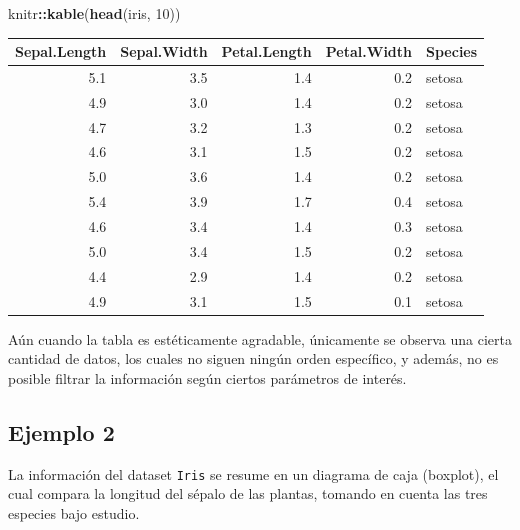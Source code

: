 \documentclass[
]{book}
\newenvironment{Shaded}{\begin{snugshade}}{\end{snugshade}}
\newcommand{\DataTypeTok}[1]{\textcolor[rgb]{0.13,0.29,0.53}{#1}}
\newcommand{\DecValTok}[1]{\textcolor[rgb]{0.00,0.00,0.81}{#1}}
\newcommand{\KeywordTok}[1]{\textcolor[rgb]{0.13,0.29,0.53}{\textbf{#1}}}
\newcommand{\NormalTok}[1]{#1}
\newcommand{\OperatorTok}[1]{\textcolor[rgb]{0.81,0.36,0.00}{\textbf{#1}}}
\newcommand{\StringTok}[1]{\textcolor[rgb]{0.31,0.60,0.02}{#1}}
\begin{document}
\begin{Shaded}
\begin{Highlighting}[]
\NormalTok{knitr}\OperatorTok{::}\KeywordTok{kable}\NormalTok{(}\KeywordTok{head}\NormalTok{(iris, }\DecValTok{10}\NormalTok{))}
\end{Highlighting}
\end{Shaded}

\begin{tabular}{r|r|r|r|l}
\hline
Sepal.Length & Sepal.Width & Petal.Length & Petal.Width & Species\\
\hline
5.1 & 3.5 & 1.4 & 0.2 & setosa\\
\hline
4.9 & 3.0 & 1.4 & 0.2 & setosa\\
\hline
4.7 & 3.2 & 1.3 & 0.2 & setosa\\
\hline
4.6 & 3.1 & 1.5 & 0.2 & setosa\\
\hline
5.0 & 3.6 & 1.4 & 0.2 & setosa\\
\hline
5.4 & 3.9 & 1.7 & 0.4 & setosa\\
\hline
4.6 & 3.4 & 1.4 & 0.3 & setosa\\
\hline
5.0 & 3.4 & 1.5 & 0.2 & setosa\\
\hline
4.4 & 2.9 & 1.4 & 0.2 & setosa\\
\hline
4.9 & 3.1 & 1.5 & 0.1 & setosa\\
\hline
\end{tabular}

Aún cuando la tabla es estéticamente agradable, únicamente se observa una cierta cantidad de datos, los cuales no siguen ningún orden específico, y además, no es posible filtrar la información según ciertos parámetros de interés.

\hypertarget{ejm2}{%
\subsection{Ejemplo 2}\label{ejm2}}

La información del dataset \texttt{Iris} se resume en un diagrama de caja (boxplot), el cual compara la longitud del sépalo de las plantas, tomando en cuenta las tres especies bajo estudio.

\begin{Shaded}
\end{Shaded}
\end{document}
